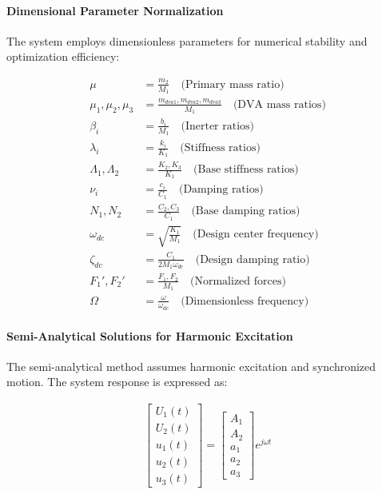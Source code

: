 \documentclass[12pt,a4paper]{article}
\begin{document}
\paragraph{Dimensional Parameter Normalization}

The system employs dimensionless parameters for numerical stability and optimization efficiency:

\begin{align}\label{Eq.dimensional.parameters.2dof3dof}
    \mu &= \frac{m_2}{M_1} \quad \text{(Primary mass ratio)} \\
    \mu_1, \mu_2, \mu_3 &= \frac{m_{dva1}, m_{dva2}, m_{dva3}}{M_1} \quad \text{(DVA mass ratios)} \\
    \beta_i &= \frac{b_i}{M_1} \quad \text{(Inerter ratios)} \\
    \lambda_i &= \frac{k_i}{K_1} \quad \text{(Stiffness ratios)} \\
    \Lambda_1, \Lambda_2 &= \frac{K_2, K_3}{K_1} \quad \text{(Base stiffness ratios)} \\
    \nu_i &= \frac{c_i}{C_1} \quad \text{(Damping ratios)} \\
    N_1, N_2 &= \frac{C_2, C_3}{C_1} \quad \text{(Base damping ratios)} \\
    \omega_{dc} &= \sqrt{\frac{K_1}{M_1}} \quad \text{(Design center frequency)} \\
    \zeta_{dc} &= \frac{C_1}{2 M_1 \omega_{dc}} \quad \text{(Design damping ratio)} \\
    F_1', F_2' &= \frac{F_1, F_2}{M_1} \quad \text{(Normalized forces)} \\
    \Omega &= \frac{\omega}{\omega_{dc}} \quad \text{(Dimensionless frequency)}
\end{align}

\paragraph{Semi-Analytical Solutions for Harmonic Excitation}

The semi-analytical method assumes harmonic excitation and synchronized motion. The system response is expressed as:

\begin{align}\label{Eq.harmonic.solution.2dof3dof}
    \begin{bmatrix}
        U_1(t) \\
        U_2(t) \\
        u_1(t) \\
        u_2(t) \\
        u_3(t)
    \end{bmatrix} =
    \begin{bmatrix}
        A_1 \\
        A_2 \\
        a_1 \\
        a_2 \\
        a_3
    \end{bmatrix} e^{j \omega t}
\end{align}
\end{document}
